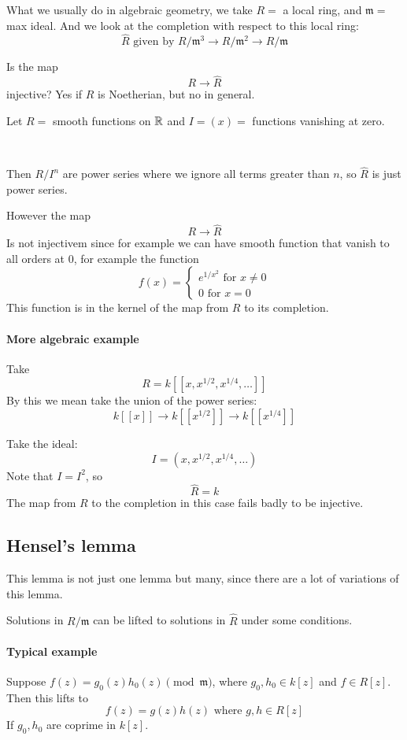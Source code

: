\begin{definition}
    What we usually do in algebraic geometry, we take $R = $ a local ring, and $\mathfrak{m} = $ max ideal. And we look at the completion with respect to this local ring:
    \[\hat{R} \text{ given by }R/\mathfrak{m}^3\rightarrow R/\mathfrak{m}^2 \rightarrow R/\mathfrak{m}\]
\end{definition}
Is the map \[R\rightarrow \hat{R}\] injective?
Yes if $R$ is Noetherian, but no in general.
\begin{example}
    Let $R = $ smooth functions on $\mathbb{R}$ and $I = (x) = $ functions vanishing at zero.

    \

    Then $R/I^n$ are power series where we ignore all terms greater than $n$, so $\hat{R}$ is just power series.

    However the map \[R\rightarrow \hat{R}\]
    Is not injectivem since for example we can have smooth function that vanish to all orders at $0$, for example the function \[f(x) = \begin{cases}
        e^{1/x^2} \text{ for }x\neq 0\\
        0 \text{ for }x=0
    \end{cases}\]
    This function is in the kernel of the map from $R$ to its completion.
\end{example}

\paragraph*{More algebraic example}
\begin{example}
    Take \[R = k[[x,x^{1/2},x^{1/4},\ldots]]\]
By this we mean take the union of the power series:\[k[[x]]\rightarrow k[[x^{1/2}]] \rightarrow k[[x^{1/4}]]\]

Take the ideal: \[I = (x,x^{1/2},x^{1/4},\dots)\]
Note that $I = I^2$, so \[\hat{R} = k\]
The map from $R$ to the completion in this case fails badly to be injective.
\end{example}
\subsection{Hensel's lemma}
This lemma is not just one lemma but many, since there are a lot of variations of this lemma.
\begin{lemma}
    Solutions in $R/\mathfrak{m}$ can be lifted to solutions in $\hat{R}$ under some conditions.
\end{lemma}
\paragraph*{Typical example}
Suppose $f(z) = g_0(z)h_0(z)\pmod \mathfrak{m}$, where $g_0,h_0\in k[z]$ and $f\in R[z]$. Then this lifts to \[f(z) = g(z)h(z)\text{ where }g,h\in R[z]\]
If $g_0,h_0$ are coprime in $k[z]$.

